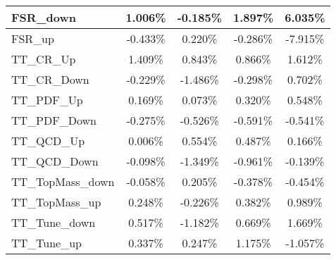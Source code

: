 \begin{table}[]
{\begin{tabular}{|l|c|c|c|c|}
FSR\_down                                & 1.006\%                                   & -0.185\%                                  & 1.897\%                                 & 6.035\%                                  \\ \hline
FSR\_up                                  & -0.433\%                                     & 0.220\%                                    & -0.286\%                                   & -7.915\%                                    \\ \hline 
TT\_CR\_Up                         & 1.409\%                          & 0.843\%                          & 0.866\%                         & 1.612\%                           \\ \hline        
TT\_CR\_Down                       & -0.229\%                        & -1.486\%                        & -0.298\%                       & 0.702\%                           \\ \hline        
TT\_PDF\_Up                        & 0.169\%                         & 0.073\%                         & 0.320\%                        & 0.548\%                       \\ \hline    
TT\_PDF\_Down                      & -0.275\%                       & -0.526\%                       & -0.591\%                      & -0.541\%                       \\ \hline    
TT\_QCD\_Up                        & 0.006\%                         & 0.554\%                         & 0.487\%                        & 0.166\%                       \\ \hline    
TT\_QCD\_Down                      & -0.098\%                       & -1.349\%                       & -0.961\%                      & -0.139\%                       \\ \hline    
TT\_TopMass\_down                      & -0.058\%                       & 0.205\%                       & -0.378\%                      & -0.454\%                       \\ \hline    
TT\_TopMass\_up                      & 0.248\%                       & -0.226\%                       & 0.382\%                      & 0.989\%                       \\ \hline        
TT\_Tune\_down            & 0.517\%             & -1.182\%             & 0.669\%            & 1.669\%             \\ \hline      
TT\_Tune\_up              & 0.337\%               & 0.247\%               & 1.175\%              & -1.057\%               \\ \hline    

\end{tabular}}
\end{table}

